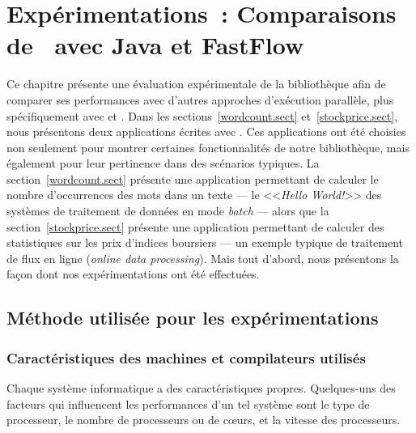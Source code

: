 
\chapter{Exp\'erimentations~: Comparaisons de \ppff\ avec Java et FastFlow}
\label{experiences.chap}

Ce chapitre pr\'esente une \'evaluation exp\'erimentale de la biblioth\`eque  afin de comparer ses performances avec d'autres approches d'ex\'ecution parall\`ele, plus sp\'ecifiquement avec  et .
%
Dans les sections~\ref{wordcount.sect} et~\ref{stockprice.sect}, nous pr\'esentons deux applications \'ecrites avec \PpFf. Ces applications ont \'et\'e choisies non seulement pour montrer certaines fonctionnalit\'es de notre biblioth\`eque, mais \'egalement pour leur pertinence dans des sc\'enarios typiques. La section~\ref{wordcount.sect} pr\'esente une application permettant de calculer le nombre d'occurrences des mots dans un texte --- le <<\emph{Hello World!}>> des syst\`emes de traitement de donn\'ees en mode \emph{batch} --- alors que la section~\ref{stockprice.sect} pr\'esente une application permettant de calculer des statistiques sur les prix d'indices boursiers --- un exemple typique de traitement de flux en ligne (\emph{online data processing}). Mais tout d'abord, nous pr\'esentons la fa\c{c}on dont nos exp\'erimentations ont \'et\'e effectu\'ees.




\section{M\'ethode utilis\'ee pour les exp\'erimentations}
\label{usedMethodsForBenchmarks.chap}

\subsection{Caractéristiques des machines et compilateurs utilisés}

Chaque syst\`eme informatique a des caract\'eristiques propres. Quelques-uns des facteurs qui influencent les performances d'un tel syst\`eme sont le type de processeur, le nombre de processeurs ou de c\oe{}urs, et la vitesse des processeurs. 


